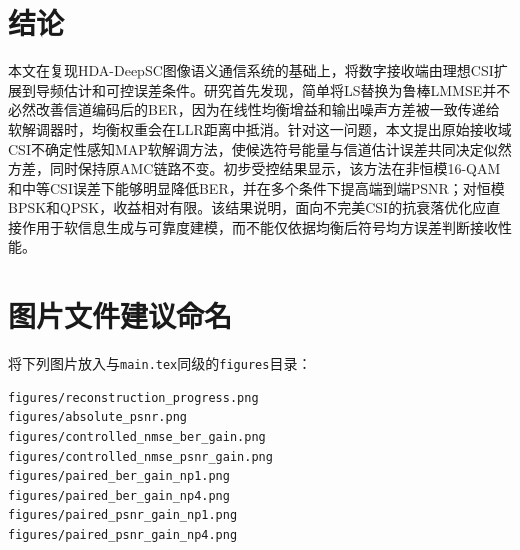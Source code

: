 \documentclass[UTF8,a4paper,11pt]{ctexart}
\newcommand{\HDADeepSC}{HDA-DeepSC}
\newcommand{\CSI}{CSI}
\newcommand{\AMC}{AMC}
\newcommand{\BER}{BER}
\newcommand{\PSNR}{PSNR}
\newcommand{\LLR}{LLR}
\begin{document}
\section{结论}
本文在复现\HDADeepSC{}图像语义通信系统的基础上，将数字接收端由理想\CSI{}扩展到导频估计和可控误差条件。研究首先发现，简单将LS替换为鲁棒LMMSE并不必然改善信道编码后的\BER{}，因为在线性均衡增益和输出噪声方差被一致传递给软解调器时，均衡权重会在\LLR{}距离中抵消。针对这一问题，本文提出原始接收域\CSI{}不确定性感知MAP软解调方法，使候选符号能量与信道估计误差共同决定似然方差，同时保持原\AMC{}链路不变。初步受控结果显示，该方法在非恒模16-QAM和中等\CSI{}误差下能够明显降低\BER{}，并在多个条件下提高端到端\PSNR{}；对恒模BPSK和QPSK，收益相对有限。该结果说明，面向不完美\CSI{}的抗衰落优化应直接作用于软信息生成与可靠度建模，而不能仅依据均衡后符号均方误差判断接收性能。




\appendix
\section{图片文件建议命名}
将下列图片放入与\texttt{main.tex}同级的\texttt{figures}目录：
\begin{verbatim}
figures/reconstruction_progress.png
figures/absolute_psnr.png
figures/controlled_nmse_ber_gain.png
figures/controlled_nmse_psnr_gain.png
figures/paired_ber_gain_np1.png
figures/paired_ber_gain_np4.png
figures/paired_psnr_gain_np1.png
figures/paired_psnr_gain_np4.png
\end{verbatim}
\end{document}
